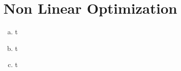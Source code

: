 \documentclass{article}
\begin{document}
\section{Non Linear Optimization}
\begin{enumerate}[(a)] 
\item t
\item t
\item t
\end{enumerate}
\end{document}
